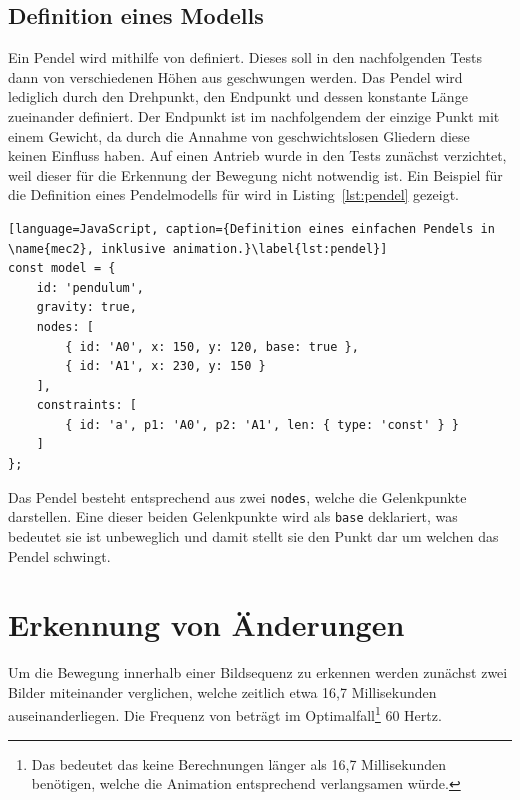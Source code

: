 \subsection{Definition eines  Modells}

Ein Pendel wird mithilfe von  definiert.
Dieses soll in den nachfolgenden Tests dann von verschiedenen Höhen aus geschwungen werden. %
Das Pendel wird lediglich durch den Drehpunkt, den Endpunkt und dessen konstante Länge zueinander definiert.
Der Endpunkt ist im nachfolgendem der einzige Punkt mit einem Gewicht, da durch die Annahme von geschwichtslosen Gliedern diese keinen Einfluss haben.
Auf einen Antrieb wurde in den Tests zunächst verzichtet, weil dieser für die Erkennung der Bewegung nicht notwendig ist.
Ein Beispiel für die Definition eines Pendelmodells für  wird in Listing~\ref{lst:pendel} gezeigt.

\begin{lstlisting}[language=JavaScript, caption={Definition eines einfachen Pendels in \name{mec2}, inklusive animation.}\label{lst:pendel}]
const model = {
    id: 'pendulum',
    gravity: true,
    nodes: [
        { id: 'A0', x: 150, y: 120, base: true },
        { id: 'A1', x: 230, y: 150 }
    ],
    constraints: [
        { id: 'a', p1: 'A0', p2: 'A1', len: { type: 'const' } }
    ]
};
\end{lstlisting}

Das Pendel besteht entsprechend aus zwei \lstinline{nodes}, welche die Gelenkpunkte darstellen.
Eine dieser beiden Gelenkpunkte wird als \lstinline{base} deklariert, was bedeutet sie ist unbeweglich und damit stellt sie den Punkt dar um welchen das Pendel schwingt.



\section{Erkennung von Änderungen}\label{ch:erkennung_von_änderungen}

Um die Bewegung innerhalb einer Bildsequenz zu erkennen werden zunächst zwei Bilder miteinander verglichen, welche zeitlich etwa 16,7 Millisekunden auseinanderliegen.
Die Frequenz von  beträgt im Optimalfall\footnote{Das bedeutet das keine Berechnungen länger als 16,7 Millisekunden benötigen, welche die Animation entsprechend verlangsamen würde.} 60 Hertz.


